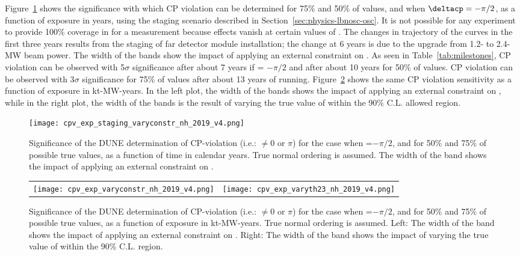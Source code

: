 Figure~\ref{fig:cpv_staging} shows the significance
with which CP violation can be determined for 75\% and 50\% of \deltacp values, and when $\deltacp=-\pi/2$, as a function of exposure in years, using the staging scenario described in Section~\ref{sec:physics-lbnosc-osc}. It is not possible for any experiment to provide 100\% coverage in \deltacp for a  measurement because  effects vanish at certain values of \deltacp. The changes in trajectory of the curves in the first three years results from the staging of far detector module installation; the change at 6 years is due to the upgrade from 1.2- to 2.4-MW beam power. The width of the bands show the impact of applying an external constraint on . As seen in Table~\ref{tab:milestones}, CP violation can be observed with 5$\sigma$ significance after about 7 years if \deltacp = $-\pi/2$ and after about 10 years for 50\% of \deltacp values. CP violation can be observed with 3$\sigma$ significance for 75\% of \deltacp values after about 13 years of running. Figure~\ref{fig:cpv_exposure} shows the same CP violation sensitivity as a function of exposure in kt-MW-years. In the left plot, the width of the bands shows the impact of applying an external constraint on , while in the right plot, the width of the bands is the result of varying the true value of  within the  90\% C.L. allowed region.

\begin{figure}[h!]
    \centering
		\texttt{[image: cpv\_exp\_staging\_varyconstr\_nh\_2019\_v4.png]}
	\caption[Significance of the DUNE determination of CP-violation as a function of time]{Significance of the DUNE determination of CP-violation (i.e.: \deltacp $\neq 0$ or $\pi$) for the case when \deltacp=$-\pi/2$, and for 50\% and 75\% of possible true \deltacp values, as a function of time in calendar years. True normal ordering is assumed. The width of the band shows the impact of applying an external constraint on .}
    \label{fig:cpv_staging}
\end{figure}

\begin{figure}[h!]
    \centering
    \begin{tabular}{cc}
		\texttt{[image: cpv\_exp\_varyconstr\_nh\_2019\_v4.png]} &
		\texttt{[image: cpv\_exp\_varyth23\_nh\_2019\_v4.png]}
    \end{tabular}
	\caption[Significance of the DUNE determination of CP-violation as a function of exposure]{Significance of the DUNE determination of CP-violation (i.e.: \deltacp $\neq 0$ or $\pi$) for the case when \deltacp=$-\pi/2$, and for 50\% and 75\% of possible true \deltacp values, as a function of exposure in kt-MW-years. True normal ordering is assumed. Left: The width of the band shows the impact of applying an external constraint on . Right: The width of the band shows the impact of varying the true value of  within the  90\% C.L. region.}
    \label{fig:cpv_exposure}
\end{figure}

